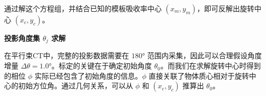通过解这个方程组，并结合已知的模板吸收率中心 $(x_m,y_m)$，即可反解出旋转中心 $(x_c,y_c)$。

\textbf{投影角度集 $\theta_j$ 求解}
\par
在平行束CT中，完整的投影数据需要在 $180°$ 范围内采集，因此可以合理假设角度增量 $\Delta\theta=1.0°$。标定的关键在于确定初始角度 $\theta_0$。而我们在求解旋转中心时得到的相位 $\phi$ 实际已经包含了初始角度的信息。$\phi$ 直接关联了物体质心相对于旋转中心的初始方位角。通过几何关系，可以从 $\phi$ 和 $(x_c,y_c)$ 推算出 $\theta_0$。  








